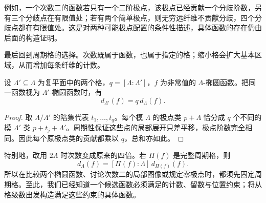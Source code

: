 例如，一个次数二的函数若只有一个二阶极点，该极点已经贡献一个分歧阶数，另有三个分歧点在有限值处；若有两个简单极点，则无穷远纤维不贡献分歧，四个分歧点都在有限值处。这是对两种可能极点配置的条件性描述，具体函数的存在仍由后面的构造证明。

\ProseParagraphBreak
最后回到周期格的选择。次数既属于函数，也属于指定的格；缩小格会扩大基本区域，从而增加每条纤维的计数。

\begin{proposition}\label{b3:prop:22-sublattice-degree}
设 \(\Lambda'\subseteq\Lambda\) 为复平面中的两个格，\(q=[\Lambda:\Lambda']\)，\(f\) 为非常值的 \(\Lambda\)-椭圆函数。把同一函数视为 \(\Lambda'\)-椭圆函数时，有
\[
 d_{\Lambda'}(f)=q\,d_\Lambda(f).
\]
\end{proposition}
\begin{proof}
取 \(\Lambda/\Lambda'\) 的陪集代表 \(t_1,\ldots,t_q\)。每个模 \(\Lambda\) 的极点类 \(p+\Lambda\) 恰分成 \(q\) 个不同的模 \(\Lambda'\) 类 \(p+t_j+\Lambda'\)。周期性保证这些点的局部展开只差平移，极点阶数完全相同。因此每个原极点类的贡献都乘以 \(q\)，总和亦如此。
\end{proof}

特别地，改用 \(2\Lambda\) 时次数变成原来的四倍。若 \(\Pi(f)\) 是完整周期格，则
\[
 d_\Lambda(f)=[\Pi(f):\Lambda]\,d_{\Pi(f)}(f).
\]
所以在比较两个椭圆函数、讨论次数二的局部图像或规定零极点时，都须先固定周期格。至此，我们已经知道一个候选函数必须满足的计数、留数与位置约束；将从格级数出发构造满足这些约束的具体函数。
